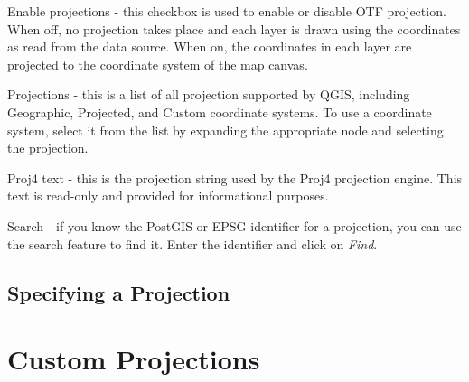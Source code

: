 \begin{compactenum}
\item Enable projections - this checkbox is used to enable or disable OTF
projection. When off, no projection takes place and each layer
is drawn using the coordinates as read from the data source. When on, the
coordinates in each layer are projected to the coordinate system of the map
canvas.
\item Projections - this is a list of all projection supported by QGIS,
including Geographic, Projected, and Custom coordinate systems. To use a
coordinate system, select it from the list by expanding the appropriate node
and selecting the projection.
\item Proj4 text - this is the projection string used by the Proj4 projection
engine. This text is read-only and provided for informational purposes.
\item Search - if you know the PostGIS or EPSG identifier for a projection,
you can use the search feature to find it. Enter the identifier and click on
\textit{Find}.

\end{compactenum}
\subsection{Specifying a Projection}


\section{Custom Projections}

